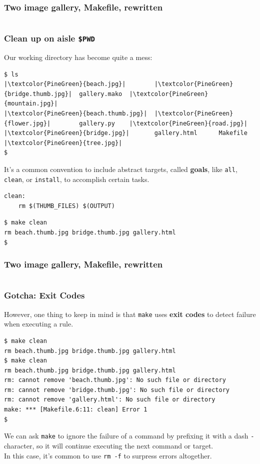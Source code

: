 \documentclass[xcolor=dvipsnames,t,compress]{beamer}
\begin{document}
\begin{frame}[fragile]
\frametitle{Two image gallery, Makefile, rewritten}
\vspace{-1em}
\inputminted[fontsize=\small,frame=single,tabsize=4]{make}{examples/make/Makefile.5}
\end{frame}

\begin{frame}[fragile]
\frametitle{Clean up on aisle \texttt{\$PWD}}
\vspace{-1em}
Our working directory has become quite a mess:
\begin{verbatim}
$ ls
|\textcolor{PineGreen}{beach.jpg}|        |\textcolor{PineGreen}{bridge.thumb.jpg}|  gallery.mako  |\textcolor{PineGreen}{mountain.jpg}|
|\textcolor{PineGreen}{beach.thumb.jpg}|  |\textcolor{PineGreen}{flower.jpg}|        gallery.py    |\textcolor{PineGreen}{road.jpg}|
|\textcolor{PineGreen}{bridge.jpg}|       gallery.html      Makefile      |\textcolor{PineGreen}{tree.jpg}|
$
\end{verbatim}
\pause
\vspace{1em}
It's a common convention to include abstract targets, called \textbf{goals}, like \texttt{all}, \texttt{clean}, or \texttt{install}, to accomplish certain tasks.
\begin{verbatim}
clean:
	rm $(THUMB_FILES) $(OUTPUT)
\end{verbatim}
\begin{verbatim}
$ make clean
rm beach.thumb.jpg bridge.thumb.jpg gallery.html
$
\end{verbatim}
\end{frame}

\begin{frame}[fragile]
\frametitle{Two image gallery, Makefile, rewritten}
\vspace{-1em}
\inputminted[fontsize=\small,frame=single,tabsize=4]{make}{examples/make/Makefile.6}
\end{frame}

\begin{frame}[fragile]
\frametitle{Gotcha: Exit Codes}
However, one thing to keep in mind is that \texttt{make} uses \textbf{exit codes} to detect failure when executing a rule.
\begin{verbatim}
$ make clean
rm beach.thumb.jpg bridge.thumb.jpg gallery.html
$ make clean
rm beach.thumb.jpg bridge.thumb.jpg gallery.html
rm: cannot remove 'beach.thumb.jpg': No such file or directory
rm: cannot remove 'bridge.thumb.jpg': No such file or directory
rm: cannot remove 'gallery.html': No such file or directory
make: *** [Makefile.6:11: clean] Error 1
$
\end{verbatim}
\pause
We can ask \texttt{make} to ignore the failure of a command by prefixing it with a dash \texttt{-} character, so it will continue executing the next command or target.
\\
\newline
In this case, it's common to use \texttt{rm -f} to surpress errors altogether.
\end{frame}
\end{document}
